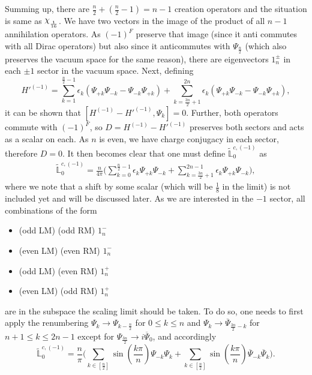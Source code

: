 \documentclass[twoside,11pt,titlepage]{amsart}
\renewcommand{\=}[1]{\stackrel{#1}{=}} %
\theoremstyle{definition}
\theoremstyle{remark}
\DeclareRobustCommand{\rchi}{{\mathpalette\irchi\relax}}
\newcommand{\irchi}[2]{\raisebox{\depth}{$#1\chi$}}
\begin{document}
Summing up, there are $\frac{n}{2}+(\frac{n}{2}-1)=n-1$ creation operators and the situation is same as $\rchi_\frac{1}{16}$. We have two vectors in the image of the product of all $n-1$ annihilation operators. As $(-1)^F$ preserve that image (since it anti commutes with all Dirac operators) but also since it anticommutes with $\Psi_{\frac{n}{2}}$ (which also preserves the vacuum space for the same reason), there are eigenvectors $1_{n}^\pm$ in each $\pm1$ sector in the vacuum space. Next, defining
$$H'^{(-1)}=\sum_{k=1}^{\frac{n}{2}-1} \epsilon_k(\Psi_{+k}\Psi_{-k}-\Psi_{-k}\Psi_{+k})+\sum_{k=\frac{3n}{2}+1}^{2n} \epsilon_k(\Psi_{+k}\Psi_{-k}-\Psi_{-k}\Psi_{+k}),$$
it can be shown that $[H^{(-1)}-H'^{(-1)},\Psi_k]=0$. Further, both operators commute with $(-1)^F$, so $D=H^{(-1)}-H'^{(-1)}$ preserves both sectors and acts as a scalar on each. As $n$ is even, we have charge conjugacy in each sector, therefore $D=0$. It then becomes clear that one must define $\widetilde{\mathbb{L}}_0^{c,(-1)}$ as
\begin{align}\label{eq28}
\widetilde{\mathbb{L}}_0^{c,(-1)}=\frac{n}{4\pi}\Big(\sum_{k=0}^{\frac{n}{2}-1} \epsilon_k\Psi_{+k}\Psi_{-k}+\sum_{k=\frac{3n}{2}+1}^{2n-1} \epsilon_k\Psi_{+k}\Psi_{-k}\Big),
\end{align}
where we note that a shift by some scalar (which will be $\frac{1}{8}$ in the limit) is not included yet and will be discussed later. As we are interested in the $-1$ sector, all combinations of the form
\begin{itemize}
    \item (odd LM) (odd RM) $1_{n}^-$
    \item (even LM) (even RM) $1_{n}^-$
    \item (odd LM) (even RM) $1_{n}^+$
    \item (even LM) (odd RM) $1_{n}^+$
\end{itemize}
are in the subspace the scaling limit should be taken. To do so, one needs to first apply the renumbering $\Psi_{k} \to \Psi_{k-\frac{n}{2}}$ for $0 \le k \le n$ and $\Psi_{k} \to \overline{\Psi}_{\frac{3n}{2}-k}$ for $n+1 \le k \le 2n-1$ except for $\Psi_\frac{3n}{2} \to i\overline{\Psi}_0$, and accordingly
$$\widetilde{\mathbb{L}}_0^{c,(-1)}=\frac{n}{\pi}\Big(\sum_{k \in [\frac{n}{2}]} \sin(\frac{k\pi}{n})\Psi_{-k}\Psi_{k}+\sum_{k \in [\frac{n}{2}]} \sin(\frac{k\pi}{n})\overline{\Psi}_{-k}\overline{\Psi}_{k}\Big).$$
\end{document}
